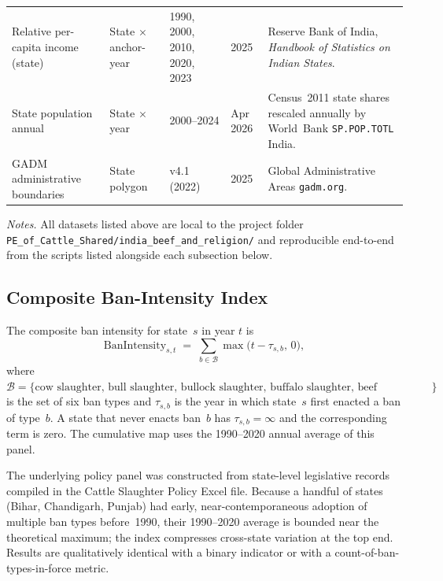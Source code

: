 \documentclass[11pt,twoside]{extarticle}
\begin{document}
\begin{landscape}
\begin{table}[!htbp]
\begin{threeparttable}
\begin{tabularx}{\linewidth}{p{2.8cm}p{3.0cm}p{2.2cm}p{2.0cm}X}
Relative per-capita income (state) & State $\times$ anchor-year & 1990, 2000, 2010, 2020, 2023 & 2025 & Reserve Bank of India, \textit{Handbook of Statistics on Indian States}. \\
State population annual & State $\times$ year & 2000--2024 & Apr 2026 & Census~2011 state shares rescaled annually by World~Bank \texttt{SP.POP.TOTL} India. \\
GADM administrative boundaries & State polygon & v4.1 (2022) & 2025 & Global Administrative Areas \texttt{gadm.org}. \\
\bottomrule[1.25pt]
\end{tabularx}
\begin{tablenotes}
\footnotesize
\textit{Notes.} All datasets listed above are local to the project folder
\texttt{PE\_of\_Cattle\_Shared/india\_beef\_and\_religion/} and reproducible
end-to-end from the scripts listed alongside each subsection below. \\
\end{tablenotes}
\end{threeparttable}
\end{table}
\end{landscape}


\subsection{Composite Ban-Intensity Index} \label{app:ban_intensity}

The composite ban intensity for state~$s$ in year $t$ is
\begin{equation*}
\text{BanIntensity}_{s,t}
\;=\;\sum_{b\in\mathcal{B}} \max\!\big(t-\tau_{s,b},\,0\big),
\end{equation*}
where $\mathcal{B}=\{\text{cow slaughter, bull slaughter, bullock slaughter,
buffalo slaughter, beef possession, beef sales}\}$ is the set of six ban
types and $\tau_{s,b}$ is the year in which state~$s$ first enacted a ban of
type~$b$. A state that never enacts ban~$b$ has $\tau_{s,b}=\infty$ and the
corresponding term is zero. The cumulative map uses the
1990--2020 annual average of this panel.

The underlying policy panel was constructed from state-level legislative
records compiled in the Cattle Slaughter Policy Excel file. Because a handful of states (Bihar, Chandigarh,
Punjab) had early, near-contemporaneous adoption of multiple ban types
before~1990, their 1990--2020 average is bounded near the theoretical
maximum; the index compresses cross-state variation at the top end. Results
are qualitatively identical with a binary indicator or with a
count-of-ban-types-in-force metric.
\end{document}

